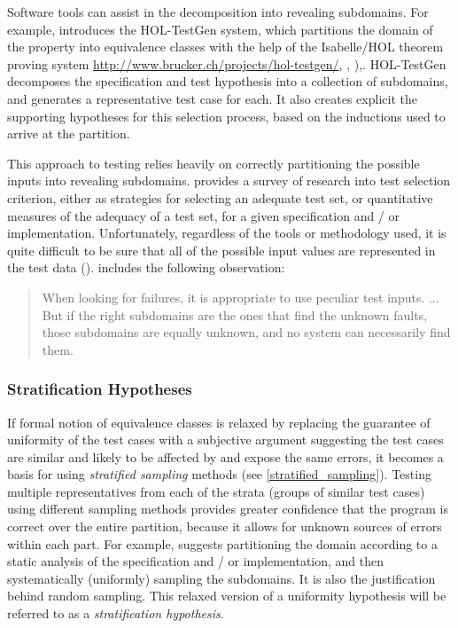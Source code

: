 {Software tools can assist in the decomposition into revealing subdomains.
For example, \cite{Brucker2012} introduces the HOL-TestGen system,
which partitions the domain of the property into equivalence classes
with the help of the Isabelle/HOL theorem proving system
\url{http://www.brucker.ch/projects/hol-testgen/}, \cite{HOL-testgen-UG}, \cite{Brucker2009}),.
HOL-TestGen decomposes the specification and test hypothesis 
into a collection of subdomains,
and generates a representative test case for each.
It also creates explicit the supporting hypotheses for this selection process,
based on the inductions used to arrive at the partition.

This approach to testing relies heavily on
correctly partitioning the possible inputs into revealing subdomains.
\cite{ZhuHallMay1997} provides a survey of research into test selection criterion, 
either as strategies for selecting an adequate test set,
or quantitative measures of the adequacy of a test set,
for a given specification and / or implementation.
Unfortunately, regardless of the tools or methodology used,
it is quite difficult to be sure that
all of the possible input values are represented in the test data 
(\cite{Cartwright1981}).
\cite{HamletTaylor1990} includes the following observation:
\begin{quote}
When looking for failures, it is appropriate to use peculiar test inputs. ...
But if the right subdomains are the ones that find the unknown faults,
those subdomains are equally unknown, and no system can necessarily find them.
\end{quote}

\subsubsection{Stratification Hypotheses}\label{sub:stratificationhyp}

If formal notion of equivalence classes is relaxed
by replacing the guarantee of uniformity of the test cases
with a subjective argument suggesting the test cases are similar
and likely to be affected by and expose the same errors,
it becomes a basis for using \emph{stratified sampling} methods 
(see \ref{stratified_sampling}).
Testing multiple representatives from each of the strata (groups of similar test cases)
using different sampling methods provides greater confidence
that the program is correct over the entire partition,
because it allows for unknown sources of errors within each part.
For example, \cite{HamletTaylor1990} suggests 
partitioning the domain according to a static analysis of
the specification and / or implementation, 
and then systematically (uniformly) sampling the subdomains.
It is also the justification behind random sampling.
This relaxed version of a uniformity hypothesis
will be referred to as a \emph{stratification hypothesis}.

}

